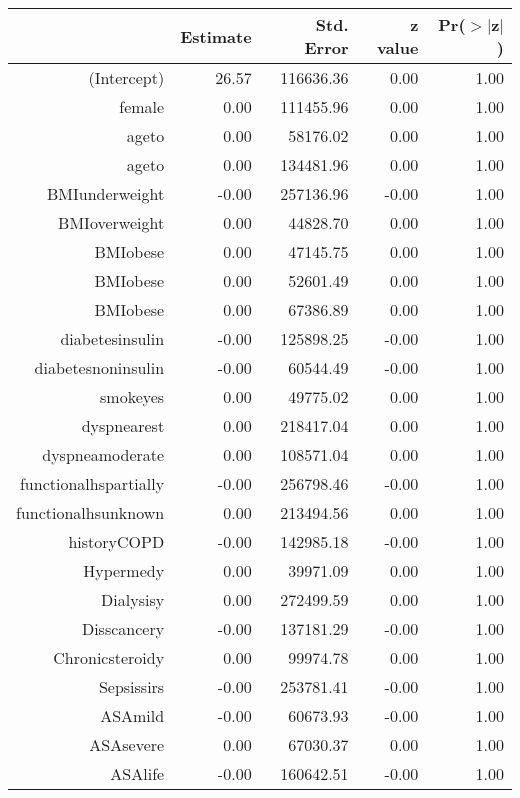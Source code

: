 \bigskip\bigskip
\centering
\begin{tabular}{rrrrr}
  \hline
 & Estimate & Std. Error & z value & Pr($>$$|$z$|$) \\ 
  \hline
(Intercept) & 26.57 & 116636.36 & 0.00 & 1.00 \\ 
  female & 0.00 & 111455.96 & 0.00 & 1.00 \\ 
  age\-65\-to\-74 & 0.00 & 58176.02 & 0.00 & 1.00 \\ 
  age\-75\-to\-84 & 0.00 & 134481.96 & 0.00 & 1.00 \\ 
  BMI\-underweight & -0.00 & 257136.96 & -0.00 & 1.00 \\ 
  BMI\-overweight & 0.00 & 44828.70 & 0.00 & 1.00 \\ 
  BMI\-obese\-1 & 0.00 & 47145.75 & 0.00 & 1.00 \\ 
  BMI\-obese\-2 & 0.00 & 52601.49 & 0.00 & 1.00 \\ 
  BMI\-obese\-3 & 0.00 & 67386.89 & 0.00 & 1.00 \\ 
  diabetes\-insulin & -0.00 & 125898.25 & -0.00 & 1.00 \\ 
  diabetes\-noninsulin & -0.00 & 60544.49 & -0.00 & 1.00 \\ 
  smoke\-yes & 0.00 & 49775.02 & 0.00 & 1.00 \\ 
  dyspnea\-rest & 0.00 & 218417.04 & 0.00 & 1.00 \\ 
  dyspnea\-moderate & 0.00 & 108571.04 & 0.00 & 1.00 \\ 
  functional\-hs\-partially & -0.00 & 256798.46 & -0.00 & 1.00 \\ 
  functional\-hs\-unknown & 0.00 & 213494.56 & 0.00 & 1.00 \\ 
  history\-COPD & -0.00 & 142985.18 & -0.00 & 1.00 \\ 
  Hyper\-med\-y & 0.00 & 39971.09 & 0.00 & 1.00 \\ 
  Dialysis\-y & 0.00 & 272499.59 & 0.00 & 1.00 \\ 
  Diss\-cancer\-y & -0.00 & 137181.29 & -0.00 & 1.00 \\ 
  Chronic\-steroid\-y & 0.00 & 99974.78 & 0.00 & 1.00 \\ 
  Sepsis\-sirs & -0.00 & 253781.41 & -0.00 & 1.00 \\ 
  ASA\-mild & -0.00 & 60673.93 & -0.00 & 1.00 \\ 
  ASA\-severe & 0.00 & 67030.37 & 0.00 & 1.00 \\ 
  ASA\-life & -0.00 & 160642.51 & -0.00 & 1.00 \\ 
   \hline
\end{tabular}

